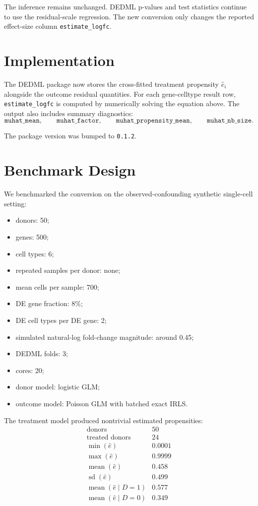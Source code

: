 \documentclass[11pt]{article}
\begin{document}
The inference remains unchanged. DEDML p-values and test statistics continue
to use the residual-scale regression. The new conversion only changes the
reported effect-size column \texttt{estimate\_logfc}.

\section*{Implementation}

The DEDML package now stores the cross-fitted treatment propensity
\(\widehat e_i\) alongside the outcome residual quantities. For each
gene-celltype result row, \texttt{estimate\_logfc} is computed by numerically
solving the equation above. The output also includes summary diagnostics:
\[
  \texttt{muhat\_mean},
  \qquad
  \texttt{muhat\_factor},
  \qquad
  \texttt{muhat\_propensity\_mean},
  \qquad
  \texttt{muhat\_nb\_size}.
\]

The package version was bumped to \texttt{0.1.2}.

\section*{Benchmark Design}

We benchmarked the conversion on the observed-confounding synthetic
single-cell setting:
\begin{itemize}
  \item donors: 50;
  \item genes: 500;
  \item cell types: 6;
  \item repeated samples per donor: none;
  \item mean cells per sample: 700;
  \item DE gene fraction: 8\%;
  \item DE cell types per DE gene: 2;
  \item simulated natural-log fold-change magnitude: around 0.45;
  \item DEDML folds: 3;
  \item cores: 20;
  \item donor model: logistic GLM;
  \item outcome model: Poisson GLM with batched exact IRLS.
\end{itemize}

The treatment model produced nontrivial estimated propensities:
\[
\begin{array}{lr}
\text{donors} & 50 \\
\text{treated donors} & 24 \\
\min(\widehat e) & 0.0001 \\
\max(\widehat e) & 0.9999 \\
\operatorname{mean}(\widehat e) & 0.458 \\
\operatorname{sd}(\widehat e) & 0.499 \\
\operatorname{mean}(\widehat e\mid D=1) & 0.577 \\
\operatorname{mean}(\widehat e\mid D=0) & 0.349
\end{array}
\]
\end{document}
